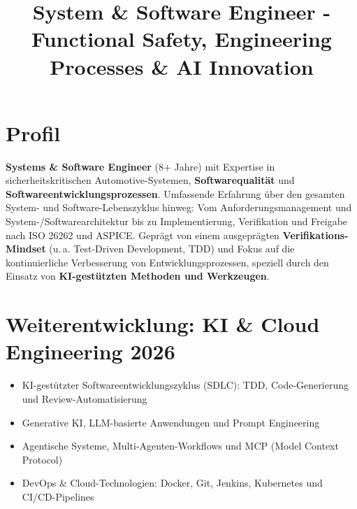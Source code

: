 \documentclass[11pt,a4paper,sans]{moderncv}
\title{System \& Software Engineer - Functional Safety, Engineering Processes \& AI Innovation}
\begin{document}
\makecvtitle

\section{Profil}
\textbf{Systems \& Software Engineer} (8+ Jahre) mit Expertise in sicherheitskritischen Automotive-Systemen, \textbf{Softwarequalität} und \textbf{Softwareentwicklungsprozessen}. Umfassende Erfahrung über den gesamten System- und Software-Lebenszyklus hinweg: Vom Anforderungsmanagement und System-/Softwarearchitektur bis zu Implementierung, Verifikation und Freigabe nach ISO 26262 und ASPICE. Geprägt von einem ausgeprägten \textbf{Verifikations-Mindset} (u.\,a. Test-Driven Development, TDD) und Fokus auf die kontinuierliche Verbesserung von Entwicklungsprozessen, speziell durch den Einsatz von \textbf{KI-gestützten Methoden und Werkzeugen}.

\section{Weiterentwicklung: KI \& Cloud Engineering 2026}

\begin{itemize}
\item KI-gestützter Softwareentwicklungszyklus (SDLC): TDD, Code-Generierung und Review-Automatisierung
\item Generative KI, LLM-basierte Anwendungen und Prompt Engineering
\item Agentische Systeme, Multi-Agenten-Workflows und MCP (Model Context Protocol)
\item DevOps \& Cloud-Technologien: Docker, Git, Jenkins, Kubernetes und CI/CD-Pipelines
\end{itemize}
\end{document}
